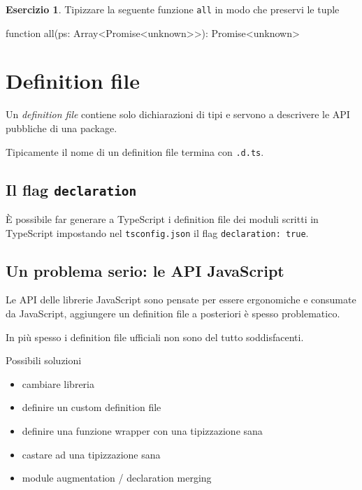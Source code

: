 \documentclass[12pt]{article}
\theoremstyle{definition}
\newtheorem{exercise}{Esercizio}[subsection]
\newenvironment{code}
  {\vspace{0.5cm} \VerbatimEnvironment\begin{typescriptcode}}
  {\end{typescriptcode} \vspace{0.2cm}}
\begin{document}
\begin{exercise}
Tipizzare la seguente funzione \texttt{all} in modo che preservi le tuple

\begin{code}
function all(ps: Array<Promise<unknown>>): Promise<unknown>
\end{code}
\end{exercise}

\newpage
\section{Definition file}

Un \emph{definition file} contiene solo dichiarazioni di tipi e servono a descrivere le API pubbliche di una package.

Tipicamente il nome di un definition file termina con \texttt{.d.ts}.

\subsection{Il flag \texttt{declaration}}

È possibile far generare a TypeScript i definition file dei moduli scritti in TypeScript impostando nel \texttt{tsconfig.json}
il flag \texttt{declaration: true}.

\subsection{Un problema serio: le API JavaScript}

Le API delle librerie JavaScript sono pensate per essere ergonomiche e consumate da JavaScript,
aggiungere un definition file a posteriori è spesso problematico.

In più spesso i definition file ufficiali non sono del tutto soddisfacenti.

Possibili soluzioni

\begin{itemize}
\item cambiare libreria
\item definire un custom definition file
\item definire una funzione wrapper con una tipizzazione sana
\item castare ad una tipizzazione sana
\item module augmentation / declaration merging
\end{itemize}
\end{document}
